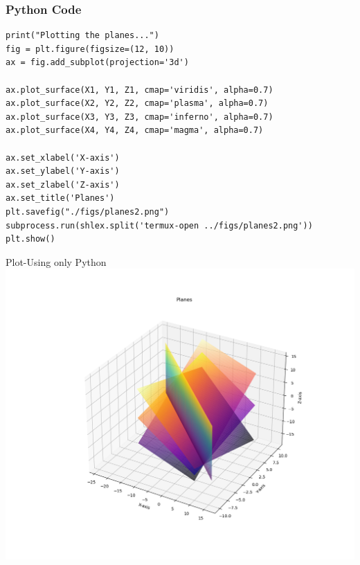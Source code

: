 \documentclass{beamer}
\begin{document}
\begin{frame}[fragile]
    \frametitle{Python Code}
    \begin{lstlisting}
print("Plotting the planes...")
fig = plt.figure(figsize=(12, 10))
ax = fig.add_subplot(projection='3d')

ax.plot_surface(X1, Y1, Z1, cmap='viridis', alpha=0.7)
ax.plot_surface(X2, Y2, Z2, cmap='plasma', alpha=0.7)
ax.plot_surface(X3, Y3, Z3, cmap='inferno', alpha=0.7)
ax.plot_surface(X4, Y4, Z4, cmap='magma', alpha=0.7)

ax.set_xlabel('X-axis')
ax.set_ylabel('Y-axis')
ax.set_zlabel('Z-axis')
ax.set_title('Planes')
plt.savefig("./figs/planes2.png")
subprocess.run(shlex.split('termux-open ../figs/planes2.png'))
plt.show()

\end{lstlisting}
\end{frame}



\begin{frame}{Plot-Using only Python}
    \centering
    \includegraphics[width=\columnwidth, height=0.8\textheight, keepaspectratio]{figs/planes2.png}     
\end{frame}
\end{document}
